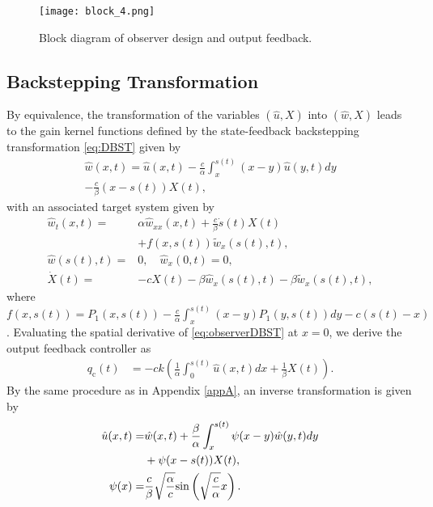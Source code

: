 \documentclass[journal]{IEEEtran}
\begin{document}
\begin{figure}[t]
\centering
\texttt{[image: block\_4.png]}
\caption{Block diagram of observer design and output feedback.}\label{statediag2}
\end{figure}

\subsection{Backstepping Transformation}\label{outputback}
By equivalence, the transformation of the variables $(\hat{u},X)$ into $(\hat{w},X)$ leads to  the gain kernel functions defined by the state-feedback backstepping transformation \eqref{eq:DBST} given by
\begin{align}\label{eq:observerDBST}
\hat{w}(x,t)=\hat{u}(x,t)-\frac{c}{\alpha} \int_{x}^{s(t)} (x-y)\hat{u}(y,t) dy\nonumber\\
-\frac{c}{\beta}(x-s(t)) X(t),
\end{align}
with an associated  target system given by
\begin{align}\label{obsvtarPDE}
\hat{w}_t(x,t)=&\alpha \hat{w}_{xx}(x,t)+\frac{c}{\beta}\dot{s}(t)X(t)\nonumber\\
 &+ f(x,s(t))\tilde{w}_{x}(s(t),t),\\
\hat{w}(s(t),t)=&0, \quad \hat{w}_{x}(0,t)=0,\\
\dot{X}(t)=&-cX(t)-\beta \hat{w}_{x}(s(t),t) - \beta \tilde{w}_{x}(s(t),t) \label{obsvtarODE},
\end{align}
where $f(x,s(t)) = P_1(x,s(t))- \frac{c}{\alpha}  \int_{x}^{s(t)} (x-y) P_1(y,s(t)) dy  -c  (s(t)-x)$.
Evaluating the spatial derivative of \eqref{eq:observerDBST} at  $x=0$, we derive  the output feedback controller  as
\begin{align}\label{output}
q_{{\mathrm c}}(t)&=-ck\left( \frac{1}{\alpha}\int_{0}^{s(t)} \hat{u}(x,t) dx+\frac{1}{\beta} X(t)\right). 
\end{align}
By the same procedure as in Appendix \ref{appA}, an inverse transformation is given by
\begin{align}\label{whatinv}
\hat{u}(x,t)=&\hat{w}(x,t)+ \frac{\beta}{\alpha}\int_{x}^{s(t)} \psi(x-y)\hat{w}(y,t) dy\notag\\
&+ \psi(x-s(t)) X(t), \\
\psi(x) =&\frac{c}{\beta} \sqrt{\frac{\alpha}{c}} {\rm sin} \left(\sqrt{\frac{c}{\alpha}} x \right). 
\end{align}
\end{document}
